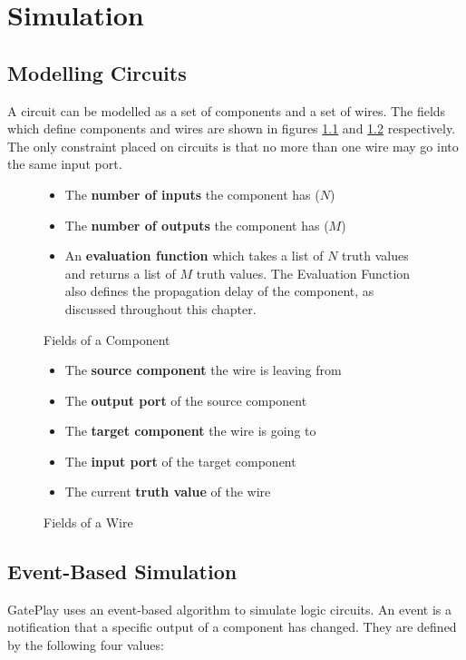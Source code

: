 \chapter{Simulation}
\label{chapter:simulation}

\section{Modelling Circuits}
A circuit can be modelled as a set of components and a set of wires. The fields which define components and wires are shown in figures \ref{fig:component} and \ref{fig:wire} respectively. The only constraint placed on circuits is that no more than one wire may go into the same input port.

\begin{figure}[H]
\centering
\begin{itemize}
	\item The \textbf{number of inputs} the component has ($N$)
	\item The \textbf{number of outputs} the component has ($M$)
	\item An \textbf{evaluation function} which takes a list of $N$ truth values and returns a list  of $M$ truth values. The Evaluation Function also defines the propagation delay of the component, as discussed throughout this chapter.
\end{itemize}
\caption{Fields of a Component}
\label{fig:component}
\end{figure}

\begin{figure}[H]
\centering
\begin{itemize}
	\item The \textbf{source component} the wire is leaving from
	\item The \textbf{output port} of the source component
	\item The \textbf{target component} the wire is going to
	\item The \textbf{input port} of the target component
	\item The current \textbf{truth value} of the wire 
\end{itemize}
\caption{Fields of a Wire}
\label{fig:wire}
\end{figure}

\section{Event-Based Simulation}
GatePlay uses an event-based algorithm to simulate logic circuits. An event is a notification that a specific output of a component has changed. They are defined by the following four values:

